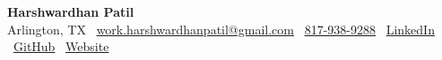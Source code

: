 \documentclass[10pt, letterpaper]{article}
\begin{document}
\begin{center}
    {\fontsize{20pt}{20pt}\selectfont \textbf{Harshwardhan Patil}} \\[6pt]
    \faMapMarker* Arlington, TX \hspace{1.2em}
    \faEnvelope\ \href{mailto:work.harshwardhanpatil@gmail.com}{work.harshwardhanpatil@gmail.com} \hspace{1.2em}
    \faPhone\ \href{tel:8179389288}{817-938-9288} \hspace{1.2em}
    \faLinkedin\ \href{https://www.linkedin.com/in/harshwardhanpatil23/}{LinkedIn} \hspace{1.2em}
    \faGithub\ \href{https://github.com/buffden}{GitHub} \hspace{1.2em}
    \faGlobe\ \href{https://buffden.com/}{Website}

\end{center}
\end{document}
